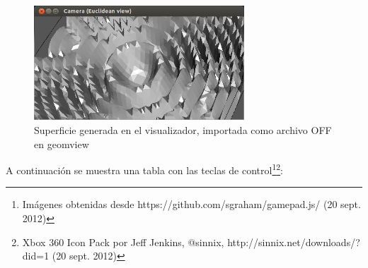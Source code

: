 \begin{figure}[!htb]
\centering
	\includegraphics[width=0.7\textwidth]{images/visualizer/geomview.png}
\caption{Superficie generada en el visualizador, importada como archivo OFF en \mbox{geomview}}
\label{f:flujoDeTrabajo:geomview}
\end{figure}

\newpage
A continuación se muestra una tabla con las teclas de control\footnote{Imágenes obtenidas desde https://github.com/sgraham/gamepad.js/ (20 sept. 2012)}\footnote{Xbox 360 Icon Pack por Jeff Jenkins, @sinnix, http://sinnix.net/downloads/?did=1 (20 sept. 2012)}:

